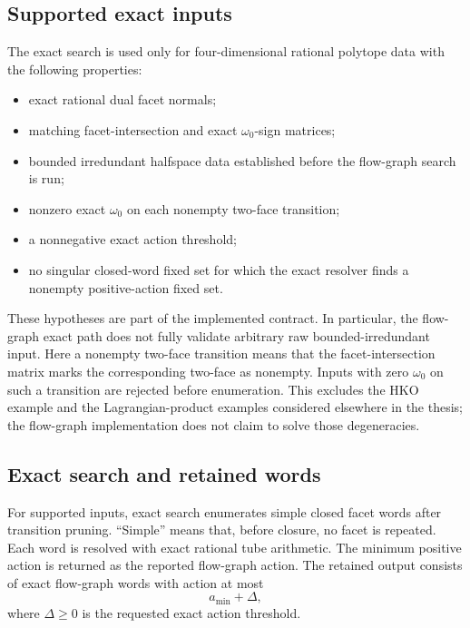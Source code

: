 \subsection{Supported exact inputs}\label{subsec:flow-graph-algorithm-ch2021-supported-inputs}

The exact search is used only for four-dimensional rational polytope data with
the following properties:

\begin{itemize}
  \item exact rational dual facet normals;
  \item matching facet-intersection and exact \(\omega_0\)-sign matrices;
  \item bounded irredundant halfspace data established before the flow-graph
    search is run;
  \item nonzero exact \(\omega_0\) on each nonempty two-face transition;
  \item a nonnegative exact action threshold;
  \item no singular closed-word fixed set for which the exact resolver finds a
    nonempty positive-action fixed set.
\end{itemize}

These hypotheses are part of the implemented contract.  In particular, the
flow-graph exact path does not fully validate arbitrary raw
bounded-irredundant input.  Here a nonempty two-face transition means that the
facet-intersection matrix marks the corresponding two-face as nonempty.  Inputs
with zero \(\omega_0\) on such a transition are rejected before enumeration.
This excludes the HKO example and the Lagrangian-product examples considered
elsewhere in the thesis; the flow-graph implementation does not claim to solve
those degeneracies.

\subsection{Exact search and retained words}\label{subsec:flow-graph-algorithm-ch2021-correctness}

For supported inputs, exact search enumerates simple closed facet words after
transition pruning.  ``Simple'' means that, before closure, no facet is
repeated.  Each word is resolved with exact rational tube arithmetic.  The
minimum positive action is returned as the reported flow-graph action.  The
retained output consists of exact flow-graph words with action at most
\[
  a_{\min}+\Delta ,
\]
where \(\Delta\ge 0\) is the requested exact action threshold.

